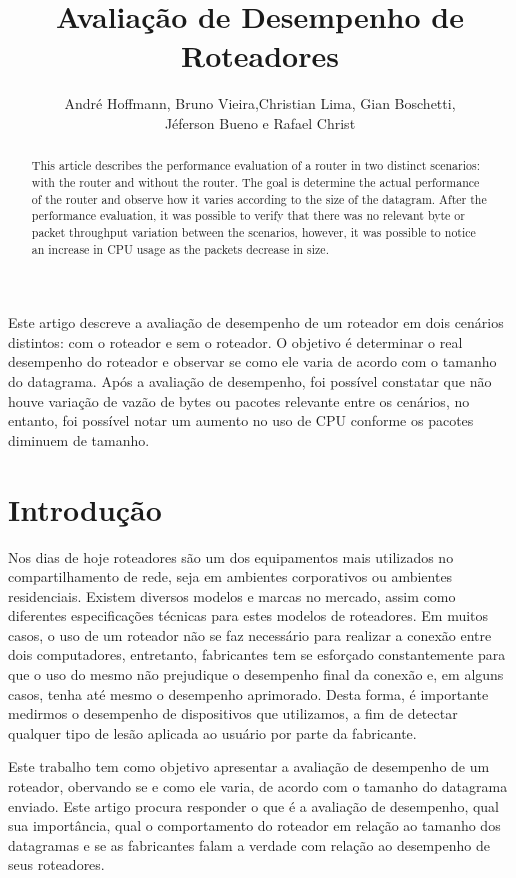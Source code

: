 \documentclass[12pt]{article}
\title{Avaliação de Desempenho de Roteadores}
\author{André Hoffmann\inst{1}, Bruno Vieira\inst{1},Christian Lima\inst{1}, Gian Boschetti\inst{1},\\Jéferson Bueno\inst{1} e Rafael Christ\inst{1} }
\begin{document}
 

\maketitle

\begin{abstract}
  This article describes the performance evaluation of a router in two distinct scenarios: with the router and without the router. The goal is determine the actual performance of the router and observe how it varies according to the size of the datagram. After the performance evaluation, it was possible to verify that there was no relevant byte or packet throughput variation between the scenarios, however, it was possible to notice an increase in CPU usage as the packets decrease in size.
\end{abstract}
     
\begin{resumo} 
  Este artigo descreve a avaliação de desempenho de um roteador em dois cenários distintos: com o roteador e sem o roteador. O objetivo é determinar o real desempenho do roteador e observar se como ele varia de acordo com o tamanho do datagrama. Após a avaliação de desempenho, foi possível constatar que não houve variação de vazão de bytes ou pacotes relevante entre os cenários, no entanto, foi possível notar um aumento no uso de CPU conforme os pacotes diminuem de tamanho.
\end{resumo}


\section{Introdução}

Nos dias de hoje roteadores são um dos equipamentos mais utilizados no compartilhamento de rede, seja em ambientes corporativos ou ambientes residenciais. Existem diversos modelos e marcas no mercado, assim como diferentes especificações técnicas para estes modelos de roteadores. Em muitos casos, o uso de um roteador não se faz necessário para realizar a conexão entre dois computadores, entretanto, fabricantes tem se esforçado constantemente para que o uso do mesmo não prejudique o desempenho final da conexão e, em alguns casos, tenha até mesmo o desempenho aprimorado. Desta forma, é importante medirmos o desempenho de dispositivos que utilizamos, a fim de detectar qualquer tipo de lesão aplicada ao usuário por parte da fabricante.

Este trabalho tem como objetivo apresentar a avaliação de desempenho de um roteador, obervando se e como ele varia, de acordo com o tamanho do datagrama enviado. Este artigo procura responder o que é a avaliação de desempenho, qual sua importância, qual o comportamento do roteador em relação ao tamanho dos datagramas e se as fabricantes falam a verdade com relação ao desempenho de seus roteadores.
\end{document}

